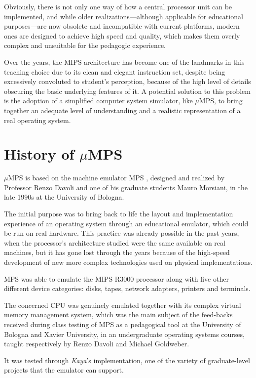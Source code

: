 \documentclass[12pt,a4paper,openright,twoside]{report}
\begin{document}
Obviously, there is not only one way of how a central processor unit can be implemented, and while older realizations---although applicable for educational purposes---are now obsolete and incompatible with current platforms, modern ones are designed to achieve high speed and quality, which makes them overly complex and unsuitable for the pedagogic experience.

Over the years, the MIPS architecture has become one of the landmarks in this teaching choice due to its clean and elegant instruction set, despite being excessively convoluted to student’s perception, because of the high level of details obscuring the basic underlying features of it.
A potential solution to this problem is the adoption of a simplified computer system simulator, like $\mu$MPS, to bring together an adequate level of understanding and a realistic representation of a real operating system.

\section{History of $\mu$MPS}
$\mu$MPS is based on the machine emulator MPS \cite{mps}, designed and realized by Professor Renzo Davoli and one of his graduate students Mauro Morsiani, in the late 1990s at the University of Bologna.

The initial purpose was to bring back to life the layout and implementation experience of an operating system through an educational emulator, which could be run on real hardware.
This practice was already possible in the past years, when the processor's architecture studied were the same available on real machines, but it has gone lost through the years because of the high-speed development of new more complex technologies used on physical implementations.

MPS was able to emulate the MIPS R3000 processor along with five other different device categories: disks, tapes, network adapters, printers and terminals.

The concerned CPU was genuinely emulated together with its complex virtual memory management system, which was the main subject of the feed-backs received during class testing of MPS as a pedagogical tool at the University of Bologna and Xavier University, in an undergraduate operating systems courses, taught respectively by Renzo Davoli and Michael Goldweber.

It was tested through \textit{Kaya}'s \cite{kaya} implementation, one of the variety of graduate-level projects that the emulator can support.
\end{document}
